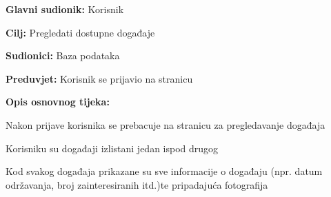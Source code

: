 				
					\noindent {}
					\begin{packed_item}
					\item \textbf{Glavni sudionik:} Korisnik
					\item  \textbf{Cilj:} Pregledati dostupne događaje
					\item  \textbf{Sudionici:} Baza podataka
					\item  \textbf{Preduvjet:} Korisnik se prijavio na stranicu
					\item  \textbf{Opis osnovnog tijeka:}
					
					\item[] \begin{packed_enum}
						
						\item Nakon prijave korisnika se prebacuje na stranicu za pregledavanje događaja
						\item Korisniku su događaji izlistani jedan ispod drugog
						\item Kod svakog događaja prikazane su sve informacije o događaju (npr. datum održavanja, broj zainteresiranih itd.)te pripadajuća fotografija
					\end{packed_enum}
					
				\end{packed_item}
				
